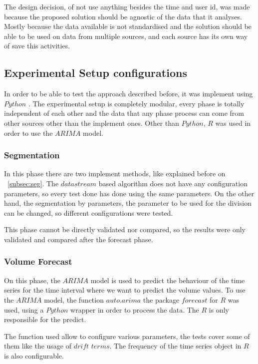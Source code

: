 The design decision, of not use anything besides the time and user id, was made
because the proposed solution should be agnostic of the data that it analyses.
Mostly because the data available is not standardised and the solution should be
able to be used on data from multiple sources, and each source has its own way
of save this activities.

\subsection{Experimental Setup configurations}

In order to be able to test the approach described before, it was implement
using $Python$ . The experimental setup is completely modular, every phase is
totally independent of each other and the data that any phase process can come
from other sources other than the implement ones.
Other than $Python$, $R$ was used in order to use the $ARIMA$ model.

\subsubsection*{Segmentation}

In this phase there are two implement methods, like explained
before on ~\ref{subsec:seg}. The $data stream$ based algorithm does not have any
configuration parameters, so every test done has done using the same parameters.
On the other hand, the segmentation by parameters, the parameter to be used for
the division can be changed, so different configurations were tested.

This phase cannot be directly validated nor compared, so the results were
only validated and compared after the forecast phase.

\subsubsection*{Volume Forecast}

On this phase, the $ARIMA$ model is used to predict the behaviour of the time
series for the time interval where we want to predict the volume values. To use
the $ARIMA$ model, the function $auto.arima$ the package $forecast$ \cite{hyndman2007automatic} for $R$
was used, using a $Python$ wrapper in order to process the data. The $R$ is only
responsible for the predict.

The function used allow to configure various parameters, the tests cover some of
them like the usage of $drift$ $terms$. The frequency of the time series object in
$R$ is also configurable.

